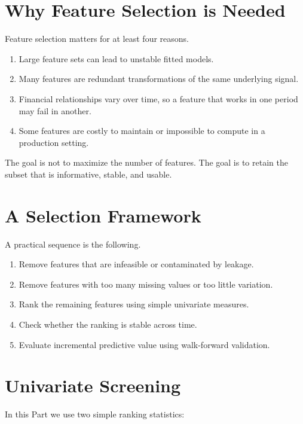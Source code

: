 \documentclass[11pt]{article}
\newcommand{\answerlines}[1]{\vspace{#1\baselineskip}}
\begin{document}
\answerlines{6}

\newpage

\section*{Why Feature Selection is Needed}

Feature selection matters for at least four reasons.

\begin{enumerate}
  \item Large feature sets can lead to unstable fitted models.
  \item Many features are redundant transformations of the same underlying signal.
  \item Financial relationships vary over time, so a feature that works in one period may fail in another.
  \item Some features are costly to maintain or impossible to compute in a production setting.
\end{enumerate}

The goal is not to maximize the number of features. The goal is to retain the
subset that is informative, stable, and usable.

\section*{A Selection Framework}

A practical sequence is the following.

\begin{enumerate}
  \item Remove features that are infeasible or contaminated by leakage.
  \item Remove features with too many missing values or too little variation.
  \item Rank the remaining features using simple univariate measures.
  \item Check whether the ranking is stable across time.
  \item Evaluate incremental predictive value using walk-forward validation.
\end{enumerate}

\section*{Univariate Screening}

In this Part we use two simple ranking statistics:
\end{document}
